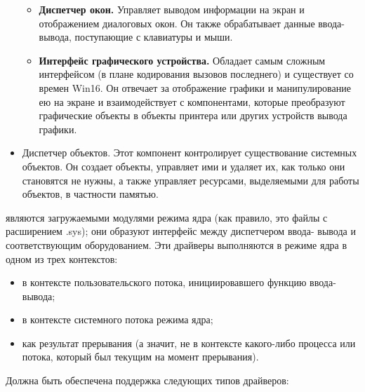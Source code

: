 \begin{itemize}
\begin{itemize}
\item \textbf{Диспетчер окон.} Управляет выводом информации на экран и отображением диалоговых окон. Он также обрабатывает данные ввода-вывода, поступающие с клавиатуры и мыши.
\item \textbf{Интерфейс графического устройства.} Обладает самым сложным интерфейсом (в плане кодирования вызовов последнего) и существует со времен Win16. Он отвечает за отображение графики и манипулирование ею на экране и взаимодействует с компонентами, которые преобразуют графические объекты в объекты принтера или других устройств вывода графики.
\end{itemize}
\item Диспетчер объектов. Этот компонент контролирует существование системных объектов. Он создает объекты, управляет ими и удаляет их, как только они становятся не нужны, а также управляет ресурсами, выделяемыми для работы объектов, в частности памятью.
\end{itemize}
являются загружаемыми модулями режима ядра (как правило,
это файлы с расширением .sys); они образуют интерфейс между диспетчером ввода-
вывода и соответствующим оборудованием. Эти драйверы выполняются в режиме ядра
в одном из трех контекстов:
\begin{itemize}
\item в контексте пользовательского потока, инициировавшего функцию ввода-
вывода;
\item в контексте системного потока режима ядра;
\item как результат прерывания (а значит, не в контексте какого-либо процесса или потока, который был текущим на момент прерывания).
\end{itemize}
Должна быть обеспечена поддержка следующих типов драйверов:
